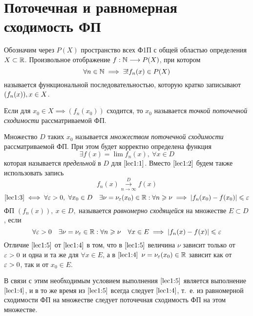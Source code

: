 \documentclass[../../main.tex]{subfiles}
\begin{document}
\section{Поточечная и равномерная сходимость ФП}
Обозначим через $P(X)$ пространство всех Ф1П 
с общей областью определения $X \subset \mathbb{R}$.
Произвольное отображение $f: \mathbb{N} \longrightarrow P(X)$, при котором 
\begin{equation}
\label{lec1:1}
\forall n \in \mathbb{N} \implies \exists! f_n(x) \in P(X)
\end{equation}
называется функциональной последовательностью, 
которую кратко записывают $(f_n(x)),\\ x\in X$.

Если для $x_0 \in X \implies (f_n(x_0))$ сходится, то $x_0$ называется
\emph{точкой поточечной сходимости} рассматриваемой ФП.

Множество $D$ таких $x_0$ называется \emph{множеством поточечной сходимости}
рассматриваемой ФП.
При этом будет корректно определена функция 
\begin{equation}
\label{lec1:2}
\exists f(x) = \lim f_n(x),\ \forall x \in D
\end{equation}
которая называется \emph{предельной} в $D$ для $\eqref{lec1:1}$.
Вместо $\eqref{lec1:2}$ будем также использовать запись 
\begin{equation}
\label{lec1:3}
f_n(x) \overset{D}{\underset{n \to \infty}\longrightarrow} f(x)
\end{equation}
\begin{equation}
\label{lec1:4}
\eqref{lec1:3} \iff \forall \varepsilon > 0,\ \forall x_0 \in D \quad 
\exists \nu = \nu_\varepsilon(x_0) \in \mathbb{R} : \forall n \geqslant \nu \implies
|f_n(x_0) - f(x_0)| \leqslant \varepsilon
\end{equation}
ФП $(f_n(x)), \ x \in D,$ называется \emph{равномерно сходящейся} 
на множестве $E \subset D$, если 
\begin{equation}
\label{lec1:5}
\forall \varepsilon > 0 \quad
\exists \nu = \nu_\varepsilon \in \mathbb{R} : 
\forall n \geqslant \nu \quad
\forall x \in E \implies 
|f_n(x) - f(x)| \leqslant \varepsilon
\end{equation}
Отличие $\eqref{lec1:5}$ от $\eqref{lec1:4}$ в том, что  в $\eqref{lec1:5}$
величина $\nu$ зависит только от $\varepsilon > 0$ и одна и та же для 
$\forall x \in E$, а в $\eqref{lec1:4}$ $\nu = \nu_\varepsilon(x_0) \in \mathbb{R}$ 
зависит как от $\varepsilon > 0$, так и от $x_0 \in E$.

В связи с этим необходимым условием выполнения $\eqref{lec1:5}$ 
является выполнение $\eqref{lec1:4}$, и в то же время из $\eqref{lec1:5}$
всегда следует $\eqref{lec1:4}$, т.~е. из равномерной сходимости ФП на 
множестве следует поточечная сходимость ФП на этом множестве.
\end{document}
